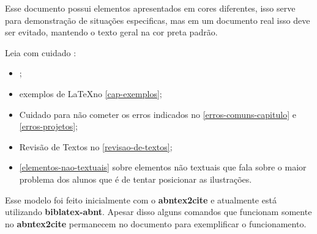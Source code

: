 Esse documento possui elementos apresentados em cores diferentes, isso serve para demonstração de situações especificas, mas em um documento real isso deve ser evitado, mantendo o texto geral na cor preta padrão.

Leia com cuidado :
\begin{itemize}
    \item {};
    
    \item exemplos de \LaTeX \space no \autoref{cap-exemplos};

    \item Cuidado para não cometer os erros indicados no \autoref{erros-comuns-capitulo} e \autoref{erros-projetos};
    
    \item Revisão de Textos no \autoref{revisao-de-textos};

    \item \autoref{elementos-nao-textuais} sobre elementos não textuais que fala sobre o maior problema dos alunos que é de tentar posicionar as ilustrações.
\end{itemize}


Esse modelo foi feito inicialmente com o \textbf{abntex2cite} e atualmente está utilizando \textbf{biblatex-abnt}. Apesar disso alguns comandos que funcionam somente no \textbf{abntex2cite} permanecem no documento para exemplificar o funcionamento.


\noindent\hrulefill

\newpage
